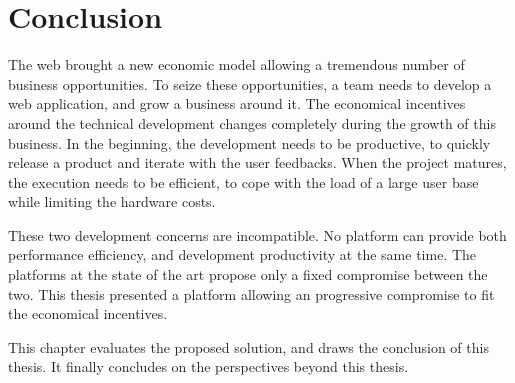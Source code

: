 \chapter{Conclusion} \label{chapter6}
\minitoc
\eject

The web brought a new economic model allowing a tremendous number of business opportunities.
To seize these opportunities, a team needs to develop a web application, and grow a business around it.
The economical incentives around the technical development changes completely during the growth of this business.
In the beginning, the development needs to be productive, to quickly release a product and iterate with the user feedbacks.
When the project matures, the execution needs to be efficient, to cope with the load of a large user base while limiting the hardware costs.

These two development concerns are incompatible.
No platform can provide both performance efficiency, and development productivity at the same time.
The platforms at the state of the art propose only a fixed compromise between the two.
This thesis presented a platform allowing an progressive compromise to fit the economical incentives.

This chapter evaluates the proposed solution, and draws the conclusion of this thesis.
It finally concludes on the perspectives beyond this thesis.



